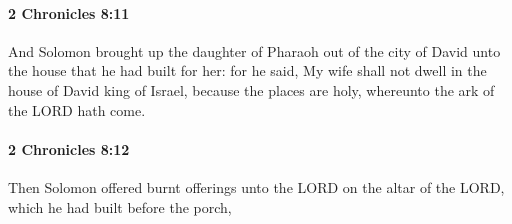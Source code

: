		\paragraph{2 Chronicles 8:11} %
			\label{2CHRONICLES-8-11}

			And Solomon brought up the daughter of Pharaoh out of the city of David unto the house that he had built for her: for he said, My wife shall not dwell in the house of David king of Israel, because the places are holy, whereunto the ark of the LORD hath come.


		\paragraph{2 Chronicles 8:12} %
			\label{2CHRONICLES-8-12}

			Then Solomon offered burnt offerings unto the LORD on the altar of the LORD, which he had built before the porch,


